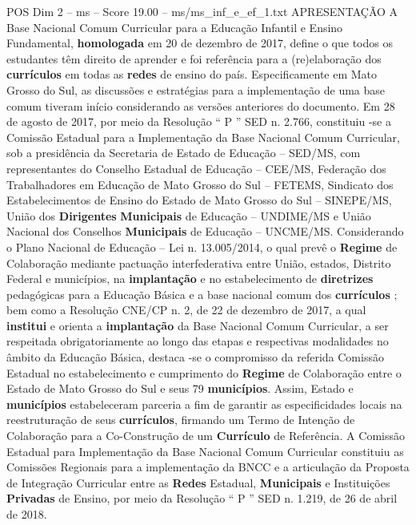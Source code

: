 \begin{textsample}{POS Dim 2 – ms – Score 19.00 – ms/ms\_inf\_e\_ef\_1.txt}  \label{ex:f2_pos_049}
APRESENTAÇÃO A Base Nacional Comum Curricular para a Educação Infantil e Ensino Fundamental, \textbf{homologada} em 20 de dezembro de 2017, define o que todos os estudantes têm direito de aprender e foi referência para a (re)elaboração dos \textbf{currículos} em todas as \textbf{redes} de ensino do país.
Especificamente em Mato Grosso do Sul, as discussões e estratégias para a implementação de uma base comum tiveram início considerando as versões anteriores do documento.
Em 28 de agosto de 2017, por meio da Resolução “ P ” SED n. 2.766, constituiu -se a Comissão Estadual para a Implementação da Base Nacional Comum Curricular, sob a presidência da Secretaria de Estado de Educação – SED/MS, com representantes do Conselho Estadual de Educação – CEE/MS, Federação dos Trabalhadores em Educação de Mato Grosso do Sul – FETEMS, Sindicato dos Estabelecimentos de Ensino do Estado de Mato Grosso do Sul – SINEPE/MS, União dos \textbf{Dirigentes} \textbf{Municipais} de Educação – UNDIME/MS e União Nacional dos Conselhos \textbf{Municipais} de Educação – UNCME/MS.
Considerando o Plano Nacional de Educação – Lei n. 13.005/2014, o qual prevê o \textbf{Regime} de Colaboração mediante pactuação interfederativa entre União, estados, Distrito Federal e municípios, na \textbf{implantação} e no estabelecimento de \textbf{diretrizes} pedagógicas para a Educação Básica e a base nacional comum dos \textbf{currículos} ; bem como a Resolução CNE/CP n. 2, de 22 de dezembro de 2017, a qual \textbf{institui} e orienta a \textbf{implantação} da Base Nacional Comum Curricular, a ser respeitada obrigatoriamente ao longo das etapas e respectivas modalidades no âmbito da Educação Básica, destaca -se o compromisso da referida Comissão Estadual no estabelecimento e cumprimento do \textbf{Regime} de Colaboração entre o Estado de Mato Grosso do Sul e seus 79 \textbf{municípios}.
Assim, Estado e \textbf{municípios} estabeleceram parceria a fim de garantir as especificidades locais na reestruturação de seus \textbf{currículos}, firmando um Termo de Intenção de Colaboração para a Co-Construção de um \textbf{Currículo} de Referência.
A Comissão Estadual para Implementação da Base Nacional Comum Curricular constituiu as Comissões Regionais para a implementação da BNCC e a articulação da Proposta de Integração Curricular entre as \textbf{Redes} Estadual, \textbf{Municipais} e Instituições \textbf{Privadas} de Ensino, por meio da Resolução “ P ” SED n. 1.219, de 26 de abril de 2018.

\end{textsample}
